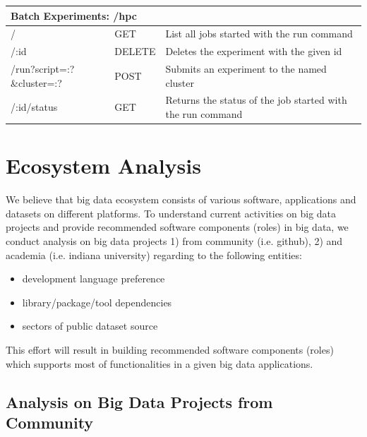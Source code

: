 \documentclass[9pt,twocolumn,twoside]{styles/osajnl}
\newcommand{\grey}{\cellcolor{lightgray}}  %
\begin{document}
\begin{table}[htb]
\begin{center}
\begin{small}
\begin{tabular}{|l|l|l|}
\hline \multicolumn{3}{|l|}{\grey\bf Batch Experiments: /hpc} \tabularnewline \hline
/                          & GET    & List all jobs started with the run command \tabularnewline \hline
/:id                       & DELETE & Deletes the experiment with the given id \tabularnewline \hline
/run?script=:?\&cluster=:? & POST   & Submits an experiment to the named cluster \tabularnewline \hline
/:id/status                & GET    & Returns the status of the job started with the run command \tabularnewline \hline

      \end{tabular}
    \end{small}
  \end{center}
\end{table}



\section{Ecosystem Analysis}

We believe that big data ecosystem consists of various software,
applications and datasets on different platforms. To understand
current activities on big data projects and provide recommended
software components (roles) in big data, we conduct analysis on big
data projects 1) from community (i.e. github), 2) and academia
(i.e. indiana university) regarding to the following entities:

\begin{itemize}
\item development language preference
\item library/package/tool dependencies
\item sectors of public dataset source
\end{itemize}

This effort will result in building recommended software components
(roles) which supports most of functionalities in a given big data
applications.

\subsection{Analysis on Big Data Projects from Community}
\end{document}
